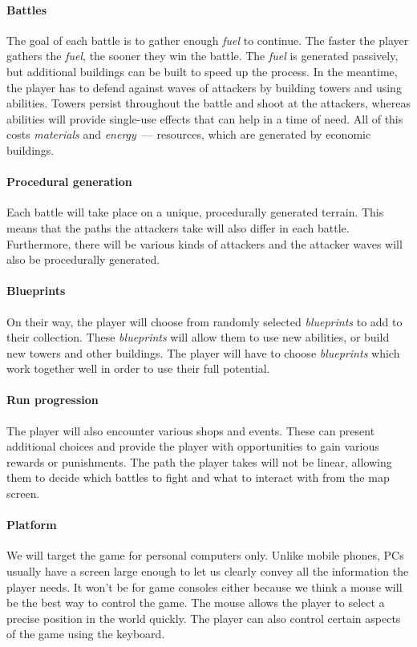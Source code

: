 \paragraph*{Battles}\label{ov-par:battles}\hfill\break
The goal of each battle is to gather enough \emph{fuel} to continue.
The faster the player gathers the \emph{fuel}, the sooner they win the battle.
The \emph{fuel} is generated passively, but additional buildings can be built to speed up the process.
In the meantime, the player has to defend against waves of attackers by building towers and using abilities.
Towers persist throughout the battle and shoot at the attackers, whereas abilities will provide single-use effects that can help in a time of need.
All of this costs \emph{materials} and \emph{energy}~--- resources, which are generated by economic buildings.

\paragraph*{Procedural generation}\label{ov-par:procedural-generation}\hfill\break
Each battle will take place on a unique, procedurally generated terrain.
This means that the paths the attackers take will also differ in each battle.
Furthermore, there will be various kinds of attackers and the attacker waves will also be procedurally generated.

\paragraph*{Blueprints}\label{ov-par:blueprints}\hfill\break
On their way, the player will choose from randomly selected \emph{blueprints} to add to their collection.
These \emph{blueprints} will allow them to use new abilities, or build new towers and other buildings.
The player will have to choose \emph{blueprints} which work together well in order to use their full potential.

\paragraph*{Run progression}\label{ov-par:run-progression}\hfill\break
The player will also encounter various shops and events.
These can present additional choices and provide the player with opportunities to gain various rewards or punishments.
The path the player takes will not be linear, allowing them to decide which battles to fight and what to interact with from the map screen.

\paragraph*{Platform}\label{ov-par:platform}\hfill\break
We will target the game for personal computers only.
Unlike mobile phones, PCs usually have a screen large enough to let us clearly convey all the information the player needs.
It won't be for game consoles either because we think a mouse will be the best way to control the game.
The mouse allows the player to select a precise position in the world quickly.
The player can also control certain aspects of the game using the keyboard.

